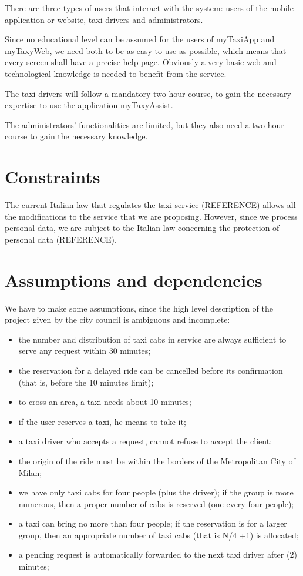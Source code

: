 There are three types of users that interact with the system: users of the mobile application or website, taxi drivers and administrators. 

Since no educational level can be assumed for the users of myTaxiApp and myTaxyWeb, we need both to be as easy to use as possible, which means that every screen shall have a precise help page. Obviously a very basic web and technological knowledge is needed to benefit from the service.

The taxi drivers will follow a mandatory two-hour course, to gain the necessary expertise to use the application myTaxyAssist. 

The administrators' functionalities are limited, but they also need a two-hour course to gain the necessary knowledge.



\section{Constraints}  

The current Italian law that regulates the taxi service (REFERENCE) allows all the modifications to the service that we are proposing. However, since we process personal data, we are subject to the Italian law concerning the protection of personal data (REFERENCE).



\section{Assumptions and dependencies}

We have to make some assumptions, since the high level description of the project given by the city council is ambiguous and incomplete:

\begin{itemize}
	\item the number and distribution of taxi cabs in service are always sufficient to serve any request within 30 minutes;
	\item the reservation for a delayed ride can be cancelled before its confirmation (that is, before the 10 minutes limit);
	\item to cross an area, a taxi needs about 10 minutes;
	\item if the user reserves a taxi, he means to take it;
	\item a taxi driver who accepts a request, cannot refuse to accept the client;
	\item the origin of the ride must be within the borders of the Metropolitan City of Milan;
	\item we have only taxi cabs for four people (plus the driver); if the group is more numerous, then a proper number of cabs is reserved (one every four people);
	\item a taxi can bring no more than four people; if the reservation is for a larger group, then an appropriate number of taxi cabs (that is N/4 +1) is allocated;
	\item a pending request is automatically forwarded to the next taxi driver after (2) minutes;
\end{itemize}


